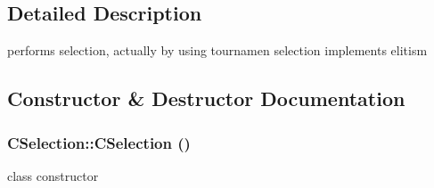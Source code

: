 \subsection{Detailed Description}
performs selection, actually by using tournamen selection implements elitism 

\subsection{Constructor \& Destructor Documentation}
\hypertarget{classCSelection_a13060ea1f1ec32b957acfaed41f2f8aa}{
\subsubsection[{CSelection}]{\setlength{\rightskip}{0pt plus 5cm}CSelection::CSelection ()}}
\label{classCSelection_a13060ea1f1ec32b957acfaed41f2f8aa}
class constructor 

